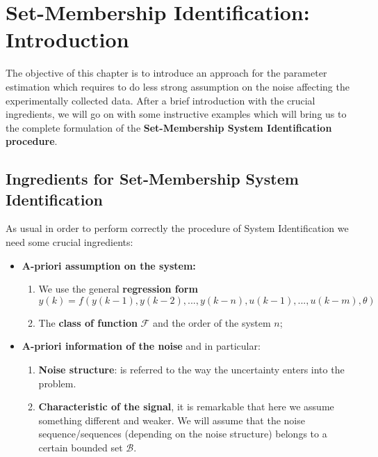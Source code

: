 \chapter{Set-Membership Identification: Introduction}

The objective of this chapter is to introduce an approach for the parameter estimation which requires to do less strong assumption on the noise affecting the experimentally collected data. After a brief introduction with the crucial ingredients, we will go on with some instructive examples which will bring us to the complete formulation of the \textbf{Set-Membership System Identification procedure}.

\section{Ingredients for Set-Membership System Identification}
As usual in order to perform correctly the procedure of System Identification we need some crucial ingredients:
\begin{itemize}
    \itemsep-0.2em
    \item[\ding{182}] \textbf{\textsf{A-priori assumption on the system:}}
    \begin{enumerate}
        \item[\ding{51}] We use the general \textbf{regression form} 
        \begin{equation} 
            y(k)=f(y(k-1), y(k-2),  ..., y(k-n), u(k-1), ..., u(k-m), \theta)
        \end{equation}
        \item[\ding{51}] The \textbf{class of function} $\mathcal{F}$ and the order of the system $n$;     
    \end{enumerate}
   
    \item[\ding{184}] \textbf{\textsf{A-priori information of the noise}} and in particular:
    \begin{enumerate}  
        \itemsep-0.2em
        \item[\ding{51}] \textbf{Noise structure}: is referred to the way the uncertainty enters  into the problem.
        \item[\ding{51}] \textbf{Characteristic of the signal}, it is remarkable that here we assume something different and weaker. We will assume that the noise sequence/sequences (depending on the noise structure) belongs to a certain bounded set $\mathcal{B}$.
    \end{enumerate}
\end{itemize}

